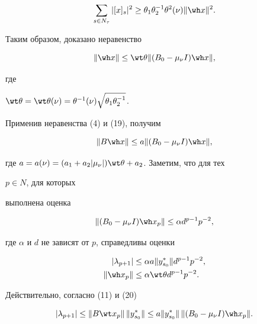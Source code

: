 \begin{pf}
\begin{multline*}
\sum_{s\in N_\tau}|[x]_s|^2\ge \theta_1\theta^{-1}_2\theta^2 


(\nu)\|\wh x\|^2. 


\end{multline*} 


Таким образом, доказано неравенство 


\begin{equation} 


\|\wh x\|\le\wt\theta\|(B_0-\mu_\nu I)\wh x\|, 


\end{equation} 


где 


$\wt\theta=\wt\theta(\nu)=\theta^{-1}(\nu)\sqrt{\theta_1\theta^{-1}_2}$.


Применив неравенства (4) и (19), получим 


\begin{equation} 


\|B\wh x\|\le a\|(B_0-\mu_\nu I)\wh x\|, 


\end{equation} 


где $a=a(\nu)=(a_1+a_2|\mu_\nu|)\wt\theta+a_2$. Заметим, что для тех 


$p\in N$, для которых 


выполнена оценка 


\begin{equation} 


\|(B_0-\mu_\nu I)\wh x_p\|\le \alpha d^{p-1}p^{-2}, 


\end{equation} 


где $\alpha$ и $d$ не зависят от $p$, справедливы оценки 


\begin{align} 


|\lambda_{p+1}|&\le\alpha a\|y^*_{s_0}\|d^{p-1}p^{-2},\\ 


\|\wh x_p\|&\le\alpha\wt\theta d^{p-1}p^{-2}. 


\end{align} 


 


Действительно, согласно (11) и (20) 


$$ 


|\lambda_{p+1}|\le\|B\wt x_p\|\,\|y^*_{s_0}\|\le 


a\|y^*_{s_0}\|\,\|(B_0-\mu_\nu I)\wh x_p\|. 


$$ 



\end{pf}
